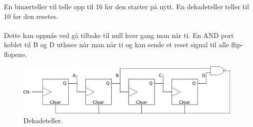 En binærteller vil telle opp til 16 før den starter på nytt.
En dekadeteller teller til 10 før den resetes.
\\\\
Dette kan oppnås ved gå tilbake til null hver gang man når ti.
En AND port koblet til B og D utløses når man når ti og kan sende et
reset signal til alle flip-flopene.
\begin{figure}[H]
  \caption{Dekadeteller.}
  \centering
  \includegraphics[width=\textwidth]{./img/dekteller}
\end{figure}
